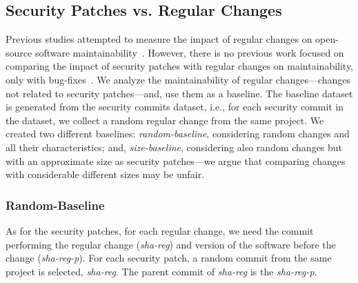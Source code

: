 \documentclass[smallextended]{svjour3}       %
\begin{document}
%
\subsection{Security Patches vs. Regular Changes}
%
Previous studies attempted to measure the impact of regular changes 
on open-source software maintainability~\cite{HEGEDUS2018313}. 
However, there is no previous work focused on comparing the impact 
of security patches with regular changes on maintainability, only
with bug-fixes~\cite{10.1145/3133956.3134072}.
We analyze the maintainability of regular changes---changes not 
related to security patches---and, use them as a baseline.
The baseline dataset is generated from the security commits dataset, i.e.,
for each security commit in the dataset, we collect a random regular
change from the same project. We created two different baselines: 
\textit{random-baseline},
considering random changes and all their characteristics; and,
\textit{size-baseline}, considering also random changes
but with an approximate size as security patches---we argue 
that comparing changes with considerable different sizes may be unfair.

\subsubsection{Random-Baseline} 

As for the security patches, for each regular change, we  
need the commit performing the regular change (\emph{sha-reg}) and version of 
the software before the change (\emph{sha-reg-p}). For each security patch, a 
random commit from the same project is selected, \emph{sha-reg}. The parent commit
of \emph{sha-reg} is the \emph{sha-reg-p}.
\end{document}
